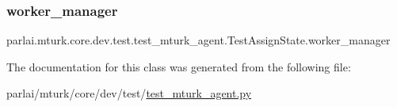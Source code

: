 \subsubsection{\texorpdfstring{worker\+\_\+manager}{worker\_manager}}
{\footnotesize\ttfamily parlai.\+mturk.\+core.\+dev.\+test.\+test\+\_\+mturk\+\_\+agent.\+Test\+Assign\+State.\+worker\+\_\+manager}



The documentation for this class was generated from the following file\+:\begin{DoxyCompactItemize}
\item 
parlai/mturk/core/dev/test/\hyperlink{dev_2test_2test__mturk__agent_8py}{test\+\_\+mturk\+\_\+agent.\+py}\end{DoxyCompactItemize}
